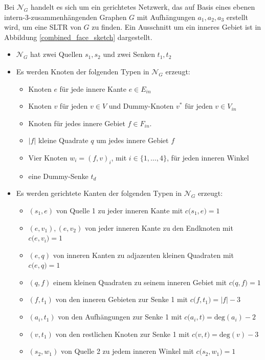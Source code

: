 \begin{network}[SLTR]\label{net_sltr}
Bei $\mathcal{N}_G$ handelt es sich um ein gerichtetes Netzwerk, das auf Basis eines ebenen intern-3-zusammenhängenden Graphen $G$ mit Aufhängungen $a_1,a_2,a_3$ erstellt wird, um eine SLTR von $G$ zu finden. Ein Ausschnitt um ein inneres Gebiet ist in Abbildung \ref{combined_face_sketch} dargestellt.
	\begin{itemize}
	\item $\mathcal{N}_G$ hat zwei Quellen $s_1,s_2$ und zwei Senken $t_1,t_2$
	\item Es werden Knoten der folgenden Typen in $\mathcal{N}_G$ erzeugt:
		\begin{itemize}
		\item Knoten $e$ für jede innere Kante $e \in E_{in}$
		\item Knoten $v$ für jeden $v \in V$ und Dummy-Knoten $v^*$ für jeden $v \in V_{in}$
		\item Knoten für jedes innere Gebiet $f \in F_{in}$.
		\item $|f|$ kleine Quadrate $q$ um jedes innere Gebiet $f$
		\item Vier Knoten $w_i=(f,v)_i$, mit $i\in\{1,\ldots,4\}$, für jeden inneren Winkel
		\item eine Dummy-Senke $t_d$
		\end{itemize}
	\item Es werden gerichtete Kanten der folgenden Typen in $\mathcal{N}_G$ erzeugt:
		\begin{itemize}
		\item $(s_1,e)$ von Quelle 1 zu jeder inneren Kante mit $c\big(s_1,e\big) = 1$
		\item $(e,v_1),(e,v_2)$ von jeder inneren Kante zu den Endknoten mit $c\big(e,v_i\big) = 1$
		\item $(e,q)$ von inneren Kanten zu adjazenten kleinen Quadraten mit $c\big(e,q\big) = 1$
		\item $(q,f)$ einem kleinen Quadraten zu seinem inneren Gebiet mit $c\big(q,f\big) = 1$
		\item $(f,t_1)$ von den inneren Gebieten zur Senke 1 mit $c\big(f,t_1\big) = |f|-3$
		\item $(a_i,t_1)$ von den Aufhängungen zur Senke 1 mit $c\big(a_i,t\big) = \text{deg}(a_i)-2$
		\item $(v,t_1)$ von den restlichen Knoten zur Senke 1 mit $c\big(v,t\big) = \text{deg}(v)-3$		
		\item $(s_2,w_1)$ von Quelle 2 zu jedem inneren Winkel mit $c\big(s_2,w_1\big) = 1$

\end{itemize}
\end{itemize}
\end{network}
